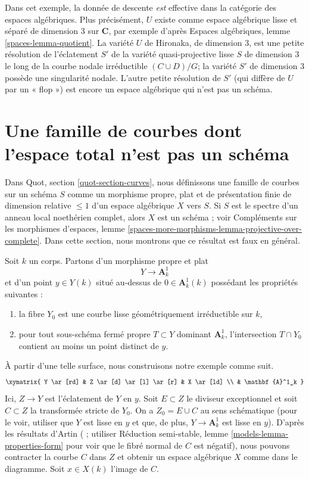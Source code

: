 \noindent
Dans cet exemple, la donnée de descente {\it est }effective dans la catégorie
des espaces algébriques. Plus précisément,
$U$ existe comme espace algébrique lisse et séparé
de dimension 3 sur ${\mathbf C}$,
par exemple d'après Espaces algébriques, lemme \ref{spaces-lemma-quotient}.
La variété $U$ de Hironaka, de dimension 3, est une petite résolution de l'éclatement $S'$
de la variété quasi-projective lisse $S$ de dimension 3 le long de la courbe nodale irréductible
$(C\cup D)/G$; la variété $S'$ de dimension 3 possède une singularité nodale. L'autre
petite résolution de $S'$ (qui diffère de $U$ par un « flop »)
est encore un espace algébrique qui n'est pas un schéma.






\section{Une famille de courbes dont l'espace total n'est pas un schéma}
\label{section-family-of-curves}

\noindent
Dans Quot, section \ref{quot-section-curves}, nous définissons une famille de courbes sur
un schéma $S$ comme un morphisme propre, plat et de présentation finie
de dimension relative $\leq 1$ d'un espace algébrique $X$ vers $S$.
Si $S$ est le spectre d'un anneau local noethérien complet, alors
$X$ est un schéma ; voir
Compléments sur les morphismes d'espaces, lemme
\ref{spaces-more-morphisms-lemma-projective-over-complete}.
Dans cette section, nous montrons que ce résultat est faux en général.

\medskip\noindent
Soit $k$ un corps. Partons d'un morphisme propre et plat
$$
Y \longrightarrow \mathbf{A}^1_k
$$
et d'un point $y \in Y(k)$ situé au-dessus de $0 \in \mathbf{A}^1_k(k)$
possédant les propriétés suivantes :
\begin{enumerate}
\item la fibre $Y_0$ est une courbe lisse géométriquement irréductible sur $k$,
\item pour tout sous-schéma fermé propre $T \subset Y$ dominant
$\mathbf{A}^1_k$, l'intersection $T \cap Y_0$ contient au moins un point
distinct de $y$.
\end{enumerate}
À partir d'une telle surface, nous construisons notre exemple comme suit.
$$
\xymatrix{
Y \ar[rd] & Z \ar[d] \ar[l] \ar[r] & X \ar[ld] \\
& \mathbf{A}^1_k
}
$$
Ici, $Z \to Y$ est l'éclatement de $Y$ en $y$. Soit $E \subset Z$ le
diviseur exceptionnel et soit $C \subset Z$ la transformée stricte de $Y_0$.
On a $Z_0 = E \cup C$ au sens schématique (pour le voir, utiliser que
$Y$ est lisse en $y$ et que, de plus, $Y \to \mathbf{A}^1_k$ est lisse en $y$).
D'après les résultats d'Artin (\cite{ArtinII} ; utiliser
Réduction semi-stable, lemme \ref{models-lemma-properties-form}
pour voir que le fibré normal de $C$ est négatif),
nous pouvons contracter la courbe $C$ dans $Z$ et obtenir un espace algébrique $X$
comme dans le diagramme. Soit $x \in X(k)$ l'image de $C$.

